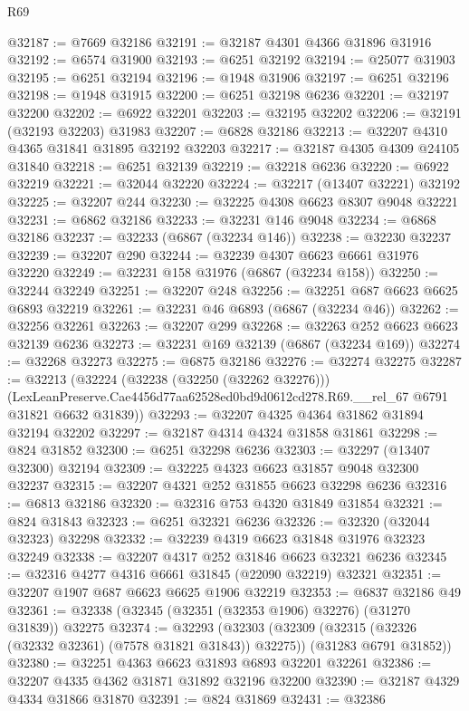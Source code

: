 \begin{lexlean}{R69}
\begin{coremodule}
{@32187 := @7669 @32186
@32191 := @32187 @4301 @4366 @31896 @31916
@32192 := @6574 @31900
@32193 := @6251 @32192
@32194 := @25077 @31903
@32195 := @6251 @32194
@32196 := @1948 @31906
@32197 := @6251 @32196
@32198 := @1948 @31915
@32200 := @6251 @32198 @6236
@32201 := @32197 @32200
@32202 := @6922 @32201
@32203 := @32195 @32202
@32206 := @32191 (@32193 @32203) @31983
@32207 := @6828 @32186
@32213 := @32207 @4310 @4365 @31841 @31895 @32192 @32203
@32217 := @32187 @4305 @4309 @24105 @31840
@32218 := @6251 @32139
@32219 := @32218 @6236
@32220 := @6922 @32219
@32221 := @32044 @32220
@32224 := @32217 (@13407 @32221) @32192
@32225 := @32207 @244
@32230 := @32225 @4308 @6623 @8307 @9048 @32221
@32231 := @6862 @32186
@32233 := @32231 @146 @9048
@32234 := @6868 @32186
@32237 := @32233 (@6867 (@32234 @146))
@32238 := @32230 @32237
@32239 := @32207 @290
@32244 := @32239 @4307 @6623 @6661 @31976 @32220
@32249 := @32231 @158 @31976 (@6867 (@32234 @158))
@32250 := @32244 @32249
@32251 := @32207 @248
@32256 := @32251 @687 @6623 @6625 @6893 @32219
@32261 := @32231 @46 @6893 (@6867 (@32234 @46))
@32262 := @32256 @32261
@32263 := @32207 @299
@32268 := @32263 @252 @6623 @6623 @32139 @6236
@32273 := @32231 @169 @32139 (@6867 (@32234 @169))
@32274 := @32268 @32273
@32275 := @6875 @32186
@32276 := @32274 @32275
@32287 := @32213
    (@32224
      (@32238 (@32250 (@32262 @32276)))
      (LexLeanPreserve.Cae4456d77aa62528ed0bd9d0612cd278.R69.__rel_67 @6791 @31821 @6632 @31839))
@32293 := @32207 @4325 @4364 @31862 @31894 @32194 @32202
@32297 := @32187 @4314 @4324 @31858 @31861
@32298 := @824 @31852
@32300 := @6251 @32298 @6236
@32303 := @32297 (@13407 @32300) @32194
@32309 := @32225 @4323 @6623 @31857 @9048 @32300 @32237
@32315 := @32207 @4321 @252 @31855 @6623 @32298 @6236
@32316 := @6813 @32186
@32320 := @32316 @753 @4320 @31849 @31854
@32321 := @824 @31843
@32323 := @6251 @32321 @6236
@32326 := @32320 (@32044 @32323) @32298
@32332 := @32239 @4319 @6623 @31848 @31976 @32323 @32249
@32338 := @32207 @4317 @252 @31846 @6623 @32321 @6236
@32345 := @32316 @4277 @4316 @6661 @31845 (@22090 @32219) @32321
@32351 := @32207 @1907 @687 @6623 @6625 @1906 @32219
@32353 := @6837 @32186 @49
@32361 := @32338 (@32345 (@32351 (@32353 @1906) @32276) (@31270 @31839)) @32275
@32374 := @32293
    (@32303
      (@32309 (@32315 (@32326 (@32332 @32361) (@7578 @31821 @31843)) @32275))
      (@31283 @6791 @31852))
@32380 := @32251 @4363 @6623 @31893 @6893 @32201 @32261
@32386 := @32207 @4335 @4362 @31871 @31892 @32196 @32200
@32390 := @32187 @4329 @4334 @31866 @31870
@32391 := @824 @31869
@32431 := @32386
}
\end{coremodule}
\end{lexlean}
